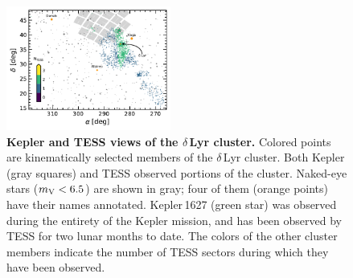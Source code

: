 \documentclass[12pt,modern,twocolumn,tighten]{aastex63}
\begin{document}
\begin{figure}[t]
	\begin{center}
		\leavevmode
		\includegraphics[width=0.48\textwidth]{f2.pdf}
	\end{center}
	\vspace{-0.7cm}
	\caption{
    {\bf Kepler and TESS views of the $\delta$\,Lyr cluster.} Colored
    points are kinematically selected members of the $\delta$\,Lyr
    cluster.  Both Kepler (gray squares) and TESS 
    observed portions of the cluster.  Naked-eye stars ($m_{\rm
    V}<6.5$) are shown in gray; four of them (orange points) have
    their names annotated.  Kepler\,1627 (green star) was observed
    during the entirety of the Kepler mission, and has been observed
    by TESS for two lunar months to date.
    The colors of the other cluster members indicate the number of
    TESS sectors during which they have been observed.
		\label{fig:skychart}
	}
\end{figure}
\end{document}

